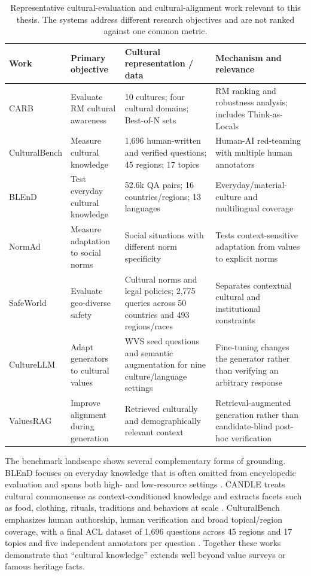 \begin{table}[htbp]
\centering
\scriptsize
\setlength{\tabcolsep}{3pt}
\renewcommand{\arraystretch}{1.13}
\caption{Representative cultural-evaluation and cultural-alignment work relevant to this thesis. The systems address different research objectives and are not ranked against one common metric.}
\label{tab:related-cultural-work}
\begin{tabular}{p{2.0cm}p{2.4cm}p{4.3cm}p{5.1cm}}
\toprule
\textbf{Work} & \textbf{Primary objective} & \textbf{Cultural representation / data} & \textbf{Mechanism and relevance} \\
\midrule
CARB \parencite{zhang2026carb} & Evaluate RM cultural awareness & 10 cultures; four cultural domains; Best-of-N sets & RM ranking and robustness analysis; includes Think-as-Locals \\
CulturalBench \parencite{chiu2025culturalbench} & Measure cultural knowledge & 1,696 human-written and verified questions; 45 regions; 17 topics & Human-AI red-teaming with multiple human annotators \\
BLEnD \parencite{myung2024blend} & Test everyday cultural knowledge & 52.6k QA pairs; 16 countries/regions; 13 languages & Everyday/material-culture and multilingual coverage \\
NormAd \parencite{rao2025normad} & Measure adaptation to social norms & Social situations with different norm specificity & Tests context-sensitive adaptation from values to explicit norms \\
SafeWorld \parencite{yin2024safeworld} & Evaluate geo-diverse safety & Cultural norms and legal policies; 2,775 queries across 50 countries and 493 regions/races & Separates contextual cultural and institutional constraints \\
CultureLLM \parencite{li2024culturellm} & Adapt generators to cultural values & WVS seed questions and semantic augmentation for nine culture/language settings & Fine-tuning changes the generator rather than verifying an arbitrary response \\
ValuesRAG \parencite{seo2025valuesrag} & Improve alignment during generation & Retrieved culturally and demographically relevant context & Retrieval-augmented generation rather than candidate-blind post-hoc verification \\
\bottomrule
\end{tabular}
\end{table}

The benchmark landscape shows several complementary forms of grounding. BLEnD focuses on everyday knowledge that is often omitted from encyclopedic evaluation and spans both high- and low-resource settings \parencite{myung2024blend}. CANDLE treats cultural commonsense as context-conditioned knowledge and extracts facets such as food, clothing, rituals, traditions and behaviors at scale \parencite{nguyen2023candle}. CulturalBench emphasizes human authorship, human verification and broad topical/region coverage, with a final ACL dataset of 1,696 questions across 45 regions and 17 topics and five independent annotators per question \parencite{chiu2025culturalbench}. Together these works demonstrate that ``cultural knowledge'' extends well beyond value surveys or famous heritage facts.

